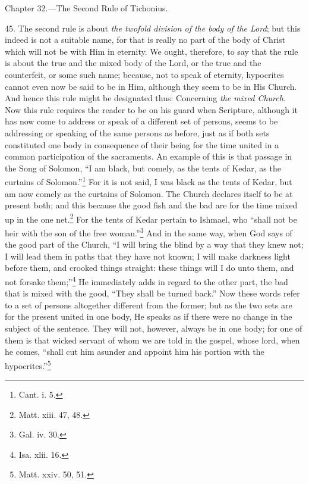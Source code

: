 
Chapter 32.—The Second Rule of Tichonius.

45. The second rule is about \emph{ the twofold division of the body of the Lord}; but this indeed is not a suitable name, for that is really no part of the body of Christ which will not be with Him in eternity. We ought, therefore, to say that the rule is about the true and the mixed body of the Lord, or the true and the counterfeit, or some such name; because, not to speak of eternity, hypocrites cannot even now be said to be in Him, although they seem to be in His Church. And hence this rule might be designated thus: Concerning \emph{the mixed Church}. Now this rule requires the reader to be on his guard when Scripture, although it has now come to address or speak of a different set of persons, seems to be addressing or speaking of the same persons as before, just as if both sets constituted one body in consequence of their being for the time united in a common participation of the sacraments. An example of this is that passage in the Song of Solomon, “I am black, but comely, as the tents of Kedar, as the curtains of Solomon.”\footnote{Cant. i. 5.} For it is not said, I was black as the tents of Kedar, but am now comely as the curtains of Solomon. The Church declares itself to be at present both; and this because the good fish and the bad are for the time mixed up in the one net.\footnote{Matt. xiii. 47, 48.} For the tents of Kedar pertain to Ishmael, who “shall not be heir with the son of the free woman.”\footnote{Gal. iv. 30.} And in the same way, when God says of the good part of the Church, “I will bring the blind by a way that they knew not; I will lead them in paths that they have not known; I will make darkness light before them, and crooked things straight: these things will I do unto them, and not forsake them;”\footnote{Isa. xlii. 16.} He immediately adds in regard to the other part, the bad that is mixed with the good, “They shall be turned back.” Now these words refer to a set of persons altogether different from the former; but as the two sets are for the present united in one body, He speaks as if there were no change in the subject of the sentence. They will not, however, always be in one body; for one of them is that wicked servant of whom we are told in the gospel, whose lord, when he comes, “shall cut him asunder and appoint him his portion with the hypocrites.”\footnote{Matt. xxiv. 50, 51.}


